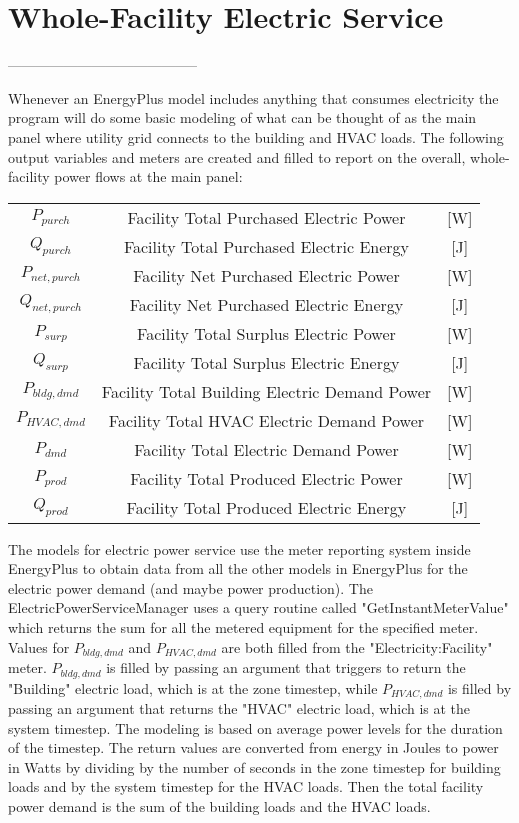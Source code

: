 \section{Whole-Facility Electric Service}\label{section-whole-facility-electric-service}
-----------------------------------------

Whenever an EnergyPlus model includes anything that consumes electricity the program will do some basic modeling of what can be thought of as the main panel where utility grid connects to the building and HVAC loads.  The following output variables and meters are created and filled to report on the overall, whole-facility power flows at the main panel: 

\begin{tabular}{c|c|c}
  $ {P_{purch}}  $ &    Facility Total Purchased Electric Power & [W] \tabularnewline
  $ {Q_{purch}}  $ &    Facility Total Purchased Electric Energy & [J] \tabularnewline
  $ {P_{net,purch}}  $ &    Facility Net Purchased Electric Power & [W] \tabularnewline
  $ {Q_{net,purch}}  $ &    Facility Net Purchased Electric Energy & [J] \tabularnewline
  $ {P_{surp}}  $ &    Facility Total Surplus Electric Power & [W] \tabularnewline
  $ {Q_{surp}}  $ &    Facility Total Surplus Electric Energy & [J] \tabularnewline
  $ {P_{bldg,dmd}}  $ &    Facility Total Building Electric Demand Power & [W] \tabularnewline
  $ {P_{HVAC,dmd}}  $ &    Facility Total HVAC Electric Demand Power & [W] \tabularnewline
  $ {P_{dmd}}  $ &    Facility Total Electric Demand Power & [W] \tabularnewline
  $ {P_{prod}}  $ &    Facility Total Produced Electric Power & [W] \tabularnewline
  $ {Q_{prod}}  $ &   Facility Total Produced Electric Energy & [J]
\end{tabular}

The models for electric power service use the meter reporting system inside EnergyPlus to obtain data from all the other models in EnergyPlus for the electric power demand (and maybe power production).  The ElectricPowerServiceManager uses a query routine called "GetInstantMeterValue" which returns the sum for all the metered equipment for the specified meter.  Values for   $P_{bldg,dmd}$ and $P_{HVAC,dmd}$ are both filled from the "Electricity:Facility" meter.  $P_{bldg,dmd}$ is filled by passing an argument that triggers to return the "Building" electric load, which is at the zone timestep, while $P_{HVAC,dmd}$ is filled by passing an argument that returns the "HVAC" electric load, which is at the system timestep.  The modeling is based on average power levels for the duration of the timestep. The return values are converted from energy in Joules to power in Watts by dividing by the number of seconds in the zone timestep for building loads and by the system timestep for the HVAC loads.  Then the total facility power demand is the sum of the building loads and the HVAC loads. 

